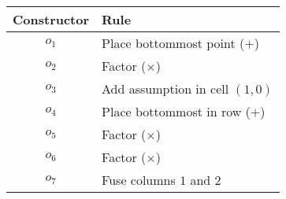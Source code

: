 \begin{tabular}{c|l}
    Constructor & Rule\\
    \hline
    $o_1$ & Place bottommost point ($+$) \\
    $o_2$ & Factor ($\times$) \\
    $o_3$ & Add assumption in cell $(1,0)$ \\
    $o_4$ & Place bottommost in row ($+$) \\
    $o_5$ & Factor ($\times$) \\
    $o_6$ & Factor ($\times$) \\
    $o_7$ & Fuse columns $1$ and $2$ \\
\end{tabular}